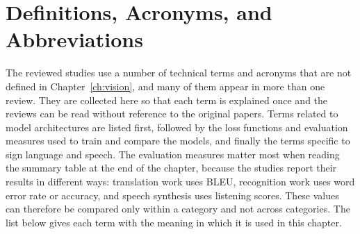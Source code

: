 \documentclass{FastFyp}
\begin{document}
\section{Definitions, Acronyms, and Abbreviations}
The reviewed studies use a number of technical terms and acronyms that are not defined in Chapter~\ref{ch:vision}, and many of them appear in more than one review. They are collected here so that each term is explained once and the reviews can be read without reference to the original papers. Terms related to model architectures are listed first, followed by the loss functions and evaluation measures used to train and compare the models, and finally the terms specific to sign language and speech. The evaluation measures matter most when reading the summary table at the end of the chapter, because the studies report their results in different ways: translation work uses BLEU, recognition work uses word error rate or accuracy, and speech synthesis uses listening scores. These values can therefore be compared only within a category and not across categories. The list below gives each term with the meaning in which it is used in this chapter.
\end{document}
